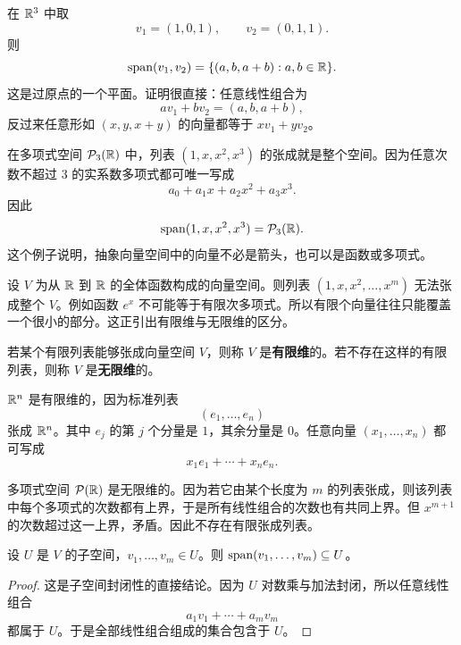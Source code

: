 \begin{example} 在 $\mathbb{R}^3$ 中取
\[ v_1=(1,0,1),\qquad v_2=(0,1,1). \]
则
\[ \operatorname{span}(v_1,v_2)=\{(a,b,a+b):a,b\in\mathbb{R}\}. \]
这是过原点的一个平面。证明很直接：任意线性组合为
\[ av_1+bv_2=(a,b,a+b), \]
反过来任意形如 $(x,y,x+y)$ 的向量都等于 $xv_1+yv_2$。
\end{example}

\begin{example} 在多项式空间 $\mathcal{P}_3(\mathbb{R})$ 中，列表 $(1,x,x^2,x^3)$ 的张成就是整个空间。因为任意次数不超过 $3$ 的实系数多项式都可唯一写成
\[ a_0+a_1x+a_2x^2+a_3x^3. \]
因此
\[ \operatorname{span}(1,x,x^2,x^3)=\mathcal{P}_3(\mathbb{R}). \]
这个例子说明，抽象向量空间中的向量不必是箭头，也可以是函数或多项式。
\end{example}

\begin{example} 设 $V$ 为从 $\mathbb{R}$ 到 $\mathbb{R}$ 的全体函数构成的向量空间。则列表 $(1,x,x^2,\dots,x^m)$ 无法张成整个 $V$。例如函数 $e^x$ 不可能等于有限次多项式。所以有限个向量往往只能覆盖一个很小的部分。这正引出有限维与无限维的区分。
\end{example}

\begin{definition} 若某个有限列表能够张成向量空间 $V$，则称 $V$ 是\textbf{有限维}的。若不存在这样的有限列表，则称 $V$ 是\textbf{无限维}的。
\end{definition}

\begin{example} $\mathbb{R}^n$ 是有限维的，因为标准列表
\[ (e_1,\dots,e_n) \]
张成 $\mathbb{R}^n$。其中 $e_j$ 的第 $j$ 个分量是 $1$，其余分量是 $0$。任意向量 $(x_1,\dots,x_n)$ 都可写成
\[ x_1e_1+\cdots+x_ne_n. \]
\end{example}

\begin{example} 多项式空间 $\mathcal{P}(\mathbb{R})$ 是无限维的。因为若它由某个长度为 $m$ 的列表张成，则该列表中每个多项式的次数都有上界，于是所有线性组合的次数也有共同上界。但 $x^{m+1}$ 的次数超过这一上界，矛盾。因此不存在有限张成列表。
\end{example}

\begin{proposition} 设 $U$ 是 $V$ 的子空间，$v_1,\dots,v_m\in U$。则 $\operatorname{span}(v_1,\dots,v_m)\subseteq U$。
\end{proposition}

\begin{proof} 这是子空间封闭性的直接结论。因为 $U$ 对数乘与加法封闭，所以任意线性组合
\[ a_1v_1+\cdots+a_mv_m \]
都属于 $U$。于是全部线性组合组成的集合包含于 $U$。
\end{proof}

